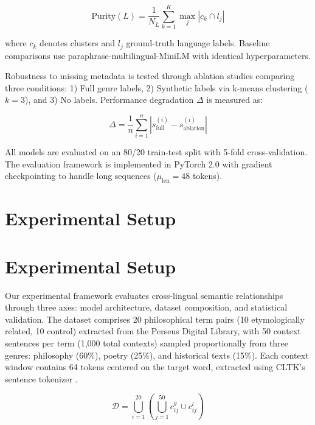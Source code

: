 \documentclass{article}
\begin{document}
\begin{equation}
\text{Purity}(L) = \frac{1}{N_L}\sum_{k=1}^K \max_j |c_k \cap l_j|
\end{equation}

where $c_k$ denotes clusters and $l_j$ ground-truth language labels. Baseline comparisons use paraphrase-multilingual-MiniLM with identical hyperparameters.

Robustness to missing metadata is tested through ablation studies comparing three conditions: 1) Full genre labels, 2) Synthetic labels via k-means clustering ($k=3$), and 3) No labels. Performance degradation $\Delta$ is measured as:

\begin{equation}
\Delta = \frac{1}{n}\sum_{i=1}^n |s_{\text{full}}^{(i)} - s_{\text{ablation}}^{(i)}|
\end{equation}

All models are evaluated on an 80/20 train-test split with 5-fold cross-validation. The evaluation framework is implemented in PyTorch 2.0 with gradient checkpointing to handle long sequences ($\mu_{\text{len}} = 48$ tokens).

\section{Experimental Setup}
\section{Experimental Setup}
Our experimental framework evaluates cross-lingual semantic relationships through three axes: model architecture, dataset composition, and statistical validation. The dataset comprises 20 philosophical term pairs (10 etymologically related, 10 control) extracted from the Perseus Digital Library, with 50 context sentences per term (1,000 total contexts) sampled proportionally from three genres: philosophy (60\%), poetry (25\%), and historical texts (15\%). Each context window contains 64 tokens centered on the target word, extracted using CLTK's sentence tokenizer \cite{johnson-2021}.

\begin{equation}
\mathcal{D} = \bigcup_{i=1}^{20} \left( \bigcup_{j=1}^{50} c_{ij}^g \cup c_{ij}^l \right)
\end{equation}
\end{document}
